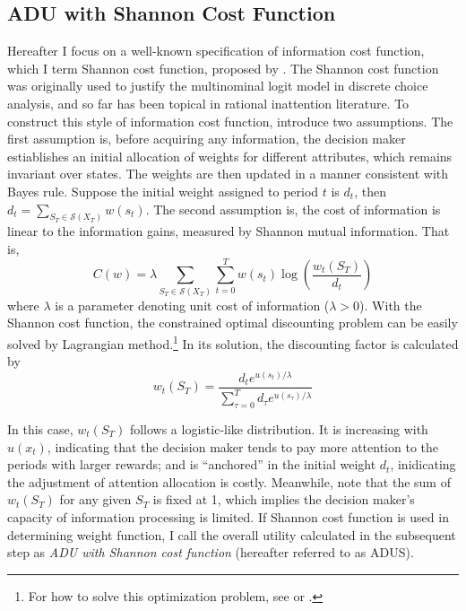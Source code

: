 \documentclass[
  12pt,
]{article}
\begin{document}
\hypertarget{adu-with-shannon-cost-function}{%
\subsection{ADU with Shannon Cost
Function}\label{adu-with-shannon-cost-function}}

Hereafter I focus on a well-known specification of information cost
function, which I term Shannon cost function, proposed by
\citet{matejka_rational_2015}. The Shannon cost function was originally
used to justify the multinominal logit model in discrete choice
analysis, and so far has been topical in rational inattention
literature. To construct this style of information cost function,
\citet{matejka_rational_2015} introduce two assumptions. The first
assumption is, before acquiring any information, the decision maker
estiablishes an initial allocation of weights for different attributes,
which remains invariant over states. The weights are then updated in a
manner consistent with Bayes rule. Suppose the initial weight assigned
to period \(t\) is \(d_t\), then
\(d_t=\sum_{S_T\in \mathcal{S}(X_T)} w(s_t)\). The second assumption is,
the cost of information is linear to the information gains, measured by
Shannon mutual information. That
is,\[ C(w)= \lambda \sum_{S_T\in \mathcal{S}(X_T)}\sum_{t=0}^T w(s_t) \log\left(\frac{w_t(S_T)}{d_t}\right) \]where
\(\lambda\) is a parameter denoting unit cost of information
(\(\lambda>0\)). With the Shannon cost function, the constrained optimal
discounting problem can be easily solved by Lagrangian
method.\footnote{For how to solve this optimization problem, see
  \citet{matejka_rational_2015} or \citet{mackowiak_rational_2023}.} In
its solution, the discounting factor is calculated by
\[ w_t(S_T) =\frac{d_te^{u(s_t)/\lambda}}{\sum_{\tau=0}^T d_\tau e^{u(s_\tau)/\lambda}} \]

In this case, \(w_t(S_T)\) follows a logistic-like distribution. It is
increasing with \(u(x_t)\), indicating that the decision maker tends to
pay more attention to the periods with larger rewards; and is
``anchored'' in the initial weight \(d_t\), inidicating the adjustment
of attention allocation is costly. Meanwhile, note that the sum of
\(w_t(S_T)\) for any given \(S_T\) is fixed at 1, which implies the
decision maker's capacity of information processing is limited. If
Shannon cost function is used in determining weight function, I call the
overall utility calculated in the subsequent step as \emph{ADU with
Shannon cost function} (hereafter referred to as ADUS).
\end{document}
